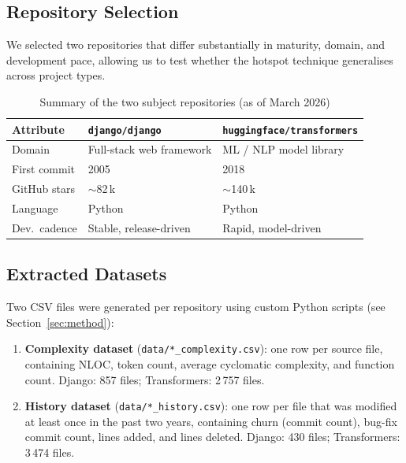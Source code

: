 \documentclass[12pt,a4paper]{article}
\begin{document}
\subsection{Repository Selection}

We selected two repositories that differ substantially in maturity, domain, and development pace, allowing us to test whether the hotspot technique generalises across project types.

\begin{table}[!htb]
\centering
\caption{Summary of the two subject repositories (as of March 2026)}
\label{tab:repos}
\begin{tabularx}{\textwidth}{lXX}
\toprule
\textbf{Attribute} & \texttt{django/django} & \texttt{huggingface/transformers} \\
\midrule
Domain        & Full-stack web framework    & ML / NLP model library \\
First commit  & 2005                        & 2018 \\
GitHub stars  & $\sim$82\,k                 & $\sim$140\,k \\
Language      & Python                      & Python \\
Dev.\ cadence & Stable, release-driven      & Rapid, model-driven \\
\bottomrule
\end{tabularx}
\end{table}

\subsection{Extracted Datasets}

Two CSV files were generated per repository using custom Python scripts (see Section~\ref{sec:method}):

\begin{enumerate}[leftmargin=2em]
  \item \textbf{Complexity dataset} (\texttt{data/*\_complexity.csv}): one row per source file, containing NLOC, token count, average cyclomatic complexity, and function count.
        Django: 857 files; Transformers: 2\,757 files.
  \item \textbf{History dataset} (\texttt{data/*\_history.csv}): one row per file that was modified at least once in the past two years, containing churn (commit count), bug-fix commit count, lines added, and lines deleted.
        Django: 430 files; Transformers: 3\,474 files.
\end{enumerate}
\end{document}

